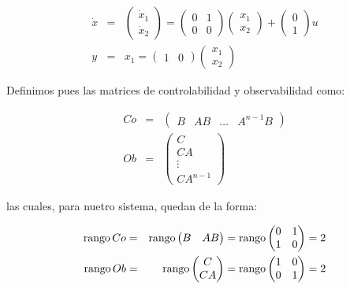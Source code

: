 		\begin{eqnarray*}
			\dot{x} & = &
			\begin{pmatrix}
				\dot{x}_1 \\
				\dot{x}_2
			\end{pmatrix} =
			\begin{pmatrix}
				0 & 1 \\
				0 & 0
			\end{pmatrix}
			\begin{pmatrix}
				x_1 \\
				x_2
			\end{pmatrix} +
			\begin{pmatrix}
				0 \\
				1
			\end{pmatrix} u \\
			y & = & x_1 =
			\begin{pmatrix}
				1 & 0
			\end{pmatrix}
			\begin{pmatrix}
				x_1 \\
				x_2
			\end{pmatrix}
		\end{eqnarray*}

		Definimos pues las matrices de controlabilidad y observabilidad como:

		\begin{eqnarray*}
			Co & = &
			\begin{pmatrix}
				B & AB & \dots & A^{n-1}B
			\end{pmatrix} \\
			Ob & = &
			\begin{pmatrix}
				C \\
				CA \\
				\vdots \\
				CA^{n-1}
			\end{pmatrix}
		\end{eqnarray*}

		las cuales, para nuetro sistema, quedan de la forma:

		\begin{eqnarray*}
			\operatorname{rango}{Co} & = & \operatorname{rango}{\begin{pmatrix} B & AB \end{pmatrix}} = \operatorname{rango}{\begin{pmatrix} 0 & 1 \\ 1 & 0 \end{pmatrix}} = 2\\
			\operatorname{rango}{Ob} & = & \operatorname{rango}{\begin{pmatrix} C \\ CA \end{pmatrix}} = \operatorname{rango}{\begin{pmatrix} 1 & 0 \\ 0 & 1 \end{pmatrix}} = 2
		\end{eqnarray*}


